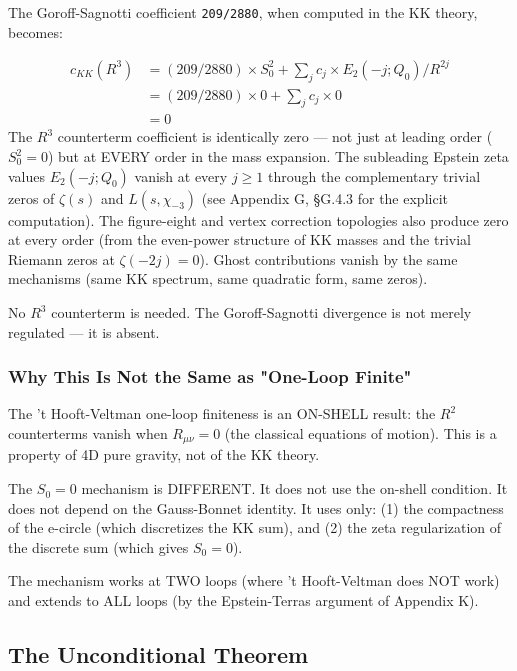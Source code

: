 \documentclass[aps,prd,preprint,superscriptaddress,longbibliography,floatfix]{revtex4-2}
\theoremstyle{remark}
\begin{document}
The Goroff-Sagnotti coefficient \texttt{209/2880}, when computed in the KK theory, becomes:


\begin{align}
    c_{KK}(R^{3}) &= (209/2880) \times S_{0}^{2} + \sum_j c_j \times E_{2}(-j; Q_{0}) / R^{2j} \\
    & = (209/2880) \times 0  + \sum_j c_j \times 0 \\
    & = 0
\end{align}
The $R^{3}$ counterterm coefficient is identically zero --- not just at leading order ($S_{0}^{2} = 0$) but at EVERY order in the mass expansion. The subleading Epstein zeta values $E_{2}(-j; Q_{0})$ vanish at every $j \geq 1$ through the complementary trivial zeros of $\zeta(s)$ and $L(s, \chi_{-3})$ (see Appendix G, \S{}G.4.3 for the explicit computation). The figure-eight and vertex correction topologies also produce zero at every order (from the even-power structure of KK masses and the trivial Riemann zeros at $\zeta(-2j) = 0$). Ghost contributions vanish by the same mechanisms (same KK spectrum, same quadratic form, same zeros).

No $R^{3}$ counterterm is needed. The Goroff-Sagnotti divergence is not merely regulated --- it is absent.


\subsubsection{Why This Is Not the Same as "One-Loop Finite"}

The 't Hooft-Veltman one-loop finiteness is an ON-SHELL result: the $R^{2}$ counterterms vanish when $R_{\mu\nu} = 0$ (the classical equations of motion). This is a property of 4D pure gravity, not of the KK theory.

The $S_{0} = 0$ mechanism is DIFFERENT. It does not use the on-shell condition. It does not depend on the Gauss-Bonnet identity. It uses only: (1) the compactness of the e-circle (which discretizes the KK sum), and (2) the zeta regularization of the discrete sum (which gives $S_{0} = 0$).

The mechanism works at TWO loops (where 't Hooft-Veltman does NOT work) and extends to ALL loops (by the Epstein-Terras argument of Appendix K).



\subsection{The Unconditional Theorem}
\end{document}
